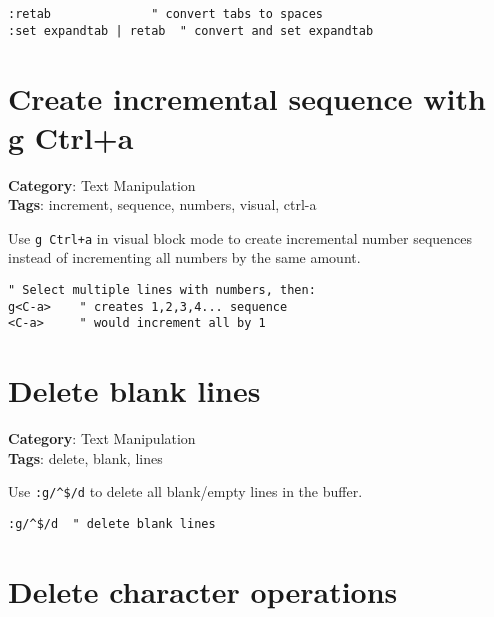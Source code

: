 {{{{{{{{{{{{{{\begin{Exa*}{}
\begin{Verbatim}[fontsize=\footnotesize, breaklines, breakanywhere]
:retab              " convert tabs to spaces
:set expandtab | retab  " convert and set expandtab
\end{Verbatim}
\end{Exa*}

\section{Create incremental sequence with g Ctrl+a}

\textbf{Category}: Text Manipulation\\ \textbf{Tags}: increment, sequence, numbers, visual, ctrl-a
\vspace{0.5cm}

Use {\footnotesize \Verb§g Ctrl+a§} in visual block mode to create incremental number sequences instead of incrementing all numbers by the same amount.

\begin{Exa*}{}
\begin{Verbatim}[fontsize=\footnotesize, breaklines, breakanywhere]
" Select multiple lines with numbers, then:
g<C-a>    " creates 1,2,3,4... sequence
<C-a>     " would increment all by 1
\end{Verbatim}
\end{Exa*}

\section{Delete blank lines}

\textbf{Category}: Text Manipulation\\ \textbf{Tags}: delete, blank, lines
\vspace{0.5cm}

Use {\footnotesize \Verb§:g/^$/d§} to delete all blank/empty lines in the buffer.

\begin{Exa*}{}
\begin{Verbatim}[fontsize=\footnotesize, breaklines, breakanywhere]
:g/^$/d  " delete blank lines
\end{Verbatim}
\end{Exa*}

\section{Delete character operations}

}}}}}}}}}}}}}}

